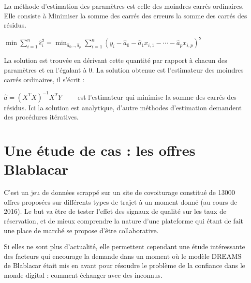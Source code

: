 \documentclass[
]{book}
\begin{document}
La méthode d'estimation des paramètres est celle des moindres carrés ordinaires. Elle consiste à Minimiser la somme des carrés des erreurs
la somme des carrés des résidus.

\(\displaystyle \min \sum _{i=1}^{n}{\hat {\epsilon }}_{i}^{2}=\min _{{\hat {a}}_{0},.,{\hat {a}}_{p}}\sum _{i=1}^{n}(y_{i}-{\hat {a}}_{0}-{\hat {a}}_{1}x_{i,1}-\cdots -{\hat {a}}_{p}x_{i,p})^{2}\)

La solution est trouvée en dérivant cette quantité par rapport à chacun des paramètres et en l'égalant à 0. La solution obtenue est l'estimateur des moindres carrés ordinaires, il s'écrit :

\(\displaystyle{\hat{a}}=(X^{T}X)^{-1}X^{T}Y\qquad\) est l'estimateur qui minimise la somme des carrés des résidus. Ici la solution est analytique, d'autre méthodes d'estimation demandent des procédures itératives.

\hypertarget{une-uxe9tude-de-cas-les-offres-blablacar}{%
\section{Une étude de cas : les offres Blablacar}\label{une-uxe9tude-de-cas-les-offres-blablacar}}

C'est un jeu de données scrappé sur un site de covoiturage constitué de 13000 offres proposées sur différents types de trajet à un moment donné (au cours de 2016). Le but va être de tester l'effet des signaux de qualité sur les taux de réservation, et de mieux comprendre la nature d'une plateforme qui étant de fait une place de marché se propose d'être collaborative.

Si elles ne sont plus d'actualité, elle permettent cependant une étude intéressante des facteurs qui encourage la demande dans un moment où le modèle DREAMS de Blablacar était mis en avant pour résoudre le problème de la confiance dans le monde digital : comment échanger avec des inconnus.
\end{document}
